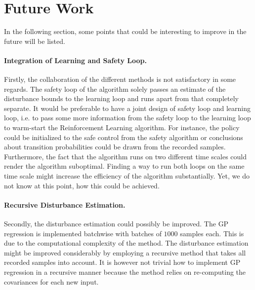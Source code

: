\documentclass[../main.tex]{subfiles}
\begin{document}
\section{Future Work}

In the following section, some points that could be interesting to improve in the future will be listed. \par

\paragraph{Integration of Learning and Safety Loop.} Firstly, the collaboration of the different methods is not satisfactory in some regards. The safety loop of the algorithm solely passes an estimate of the disturbance bounds to the learning loop and runs apart from that completely separate. It would be preferable to have a joint design of safety loop and learning loop, i.e. to pass some more information from the safety loop to the learning loop to warm-start the Reinforcement Learning algorithm. For instance, the policy could be initialized to the safe control from the safety algorithm or conclusions about transition probabilities could be drawn from the recorded samples. Furthermore, the fact that the algorithm runs on two different time scales could render the algorithm suboptimal. Finding a way to run both loops on the same time scale might increase the efficiency of the algorithm substantially. Yet, we do not know at this point, how this could be achieved.\par
\paragraph{Recursive Disturbance Estimation.} Secondly, the disturbance estimation could possibly be improved. The GP regression is implemented batchwise with batches of $1000$ samples each. This is due to the computational complexity of the method. The disturbance estimation might be improved considerably by employing a recursive method that takes all recorded samples into account. It is however not trivial how to implement GP regression in a recursive manner because the method relies on re-computing the covariances for each new input.\par
\end{document}
